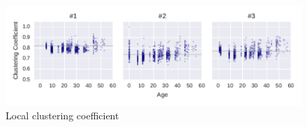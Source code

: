 \begin{figure}[htb]
	\centering
	\includegraphics[width=1.0\textwidth]{Figures/stat-ccAge}
	\caption[Local clustering coefficient]{Local clustering coefficient}
	\label{fig:ccAge}
\end{figure}
